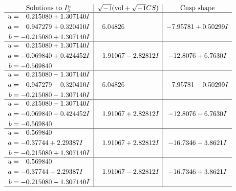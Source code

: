 \documentclass[1p]{elsarticle_modified}
\theoremstyle{definition}
\newcommand{\I}{\sqrt{-1}}
\begin{document}
$$\begin{array}{c|c|c}  
\text{Solutions to }I^u_{3}& \I (\text{vol} + \sqrt{-1}CS) & \text{Cusp shape}\\
 \hline 
\begin{aligned}
u &= \phantom{-}0.215080 + 1.307140 I \\
a &= \phantom{-}0.947279 + 0.320410 I \\
b &= -0.215080 + 1.307140 I\end{aligned}
 & \phantom{-}6.04826\phantom{ +0.000000I} & -7.95781 + 0.50299 I \\ \hline\begin{aligned}
u &= \phantom{-}0.215080 + 1.307140 I \\
a &= -0.069840 + 0.424452 I \\
b &= -0.569840\phantom{ +0.000000I}\end{aligned}
 & \phantom{-}1.91067 - 2.82812 I & -12.8076 + 6.7630 I \\ \hline\begin{aligned}
u &= \phantom{-}0.215080 - 1.307140 I \\
a &= \phantom{-}0.947279 - 0.320410 I \\
b &= -0.215080 - 1.307140 I\end{aligned}
 & \phantom{-}6.04826\phantom{ +0.000000I} & -7.95781 - 0.50299 I \\ \hline\begin{aligned}
u &= \phantom{-}0.215080 - 1.307140 I \\
a &= -0.069840 - 0.424452 I \\
b &= -0.569840\phantom{ +0.000000I}\end{aligned}
 & \phantom{-}1.91067 + 2.82812 I & -12.8076 - 6.7630 I \\ \hline\begin{aligned}
u &= \phantom{-}0.569840\phantom{ +0.000000I} \\
a &= -0.37744 + 2.29387 I \\
b &= -0.215080 + 1.307140 I\end{aligned}
 & \phantom{-}1.91067 + 2.82812 I & -16.7346 - 3.8621 I \\ \hline\begin{aligned}
u &= \phantom{-}0.569840\phantom{ +0.000000I} \\
a &= -0.37744 - 2.29387 I \\
b &= -0.215080 - 1.307140 I\end{aligned}
 & \phantom{-}1.91067 - 2.82812 I & -16.7346 + 3.8621 I\\
 \hline 
 \end{array}$$\newpage
\end{document}
